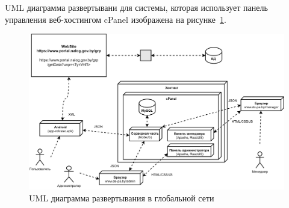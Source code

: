 UML диаграмма развертывани для системы,
которая использует панель управления веб-хостингом cPanel изображена на рисунке~\ref{fig:db_UML_deployment_prod}.

\begin{figure}[!h]
    \centering

    \includegraphics[width=15cm]
    {images/UML/deployment/production_no_comment.png}

    \caption{UML диаграмма развертывания в глобальной сети}

    \label{fig:db_UML_deployment_prod}
\end{figure}
